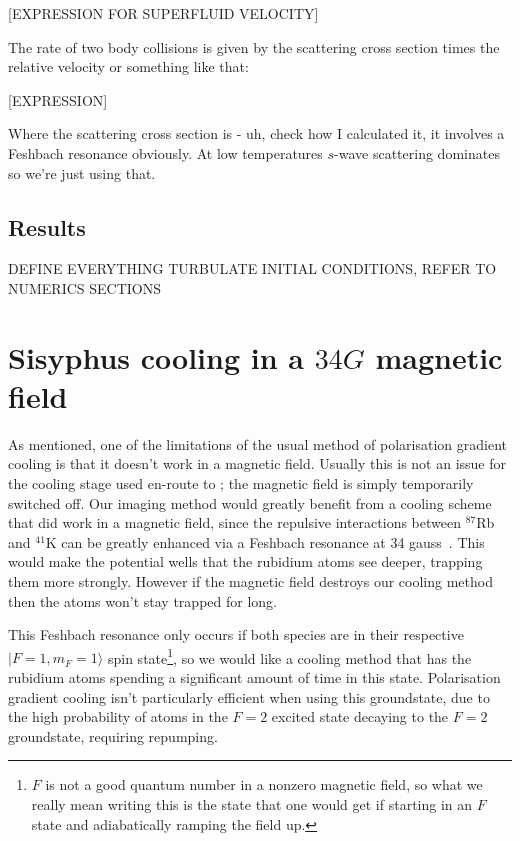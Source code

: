 [EXPRESSION FOR SUPERFLUID VELOCITY]

The rate of two body collisions is given by the scattering cross section times the relative velocity or something like that:

[EXPRESSION]

Where the scattering cross section is - uh, check how I calculated it, it involves a Feshbach resonance obviously. At low temperatures $s$-wave scattering dominates so we're just using that.


\subsection{Results}

DEFINE EVERYTHING TURBULATE INITIAL CONDITIONS, REFER TO NUMERICS SECTIONS

\section{Sisyphus cooling in a $34\unit{G}$ magnetic field}\label{sec:laser_cooling_simulations}

As mentioned, one of the limitations of the usual method of polarisation gradient cooling is that it doesn't work in a magnetic field. Usually this is not an issue for the cooling stage used en-route to \bec; the magnetic field is simply temporarily switched off. Our imaging method would greatly benefit from a cooling scheme that did work in a magnetic field, since the repulsive interactions between $^{87}$Rb and $^{41}$K can be greatly enhanced via a Feshbach resonance at 34 gauss~\cite{thalhammer_double_2008}. This would make the potential wells that the rubidium atoms see deeper, trapping them more strongly. However if the magnetic field destroys our cooling method then the atoms won't stay trapped for long.

This Feshbach resonance only occurs if both species are in their respective \mbox{$|F=1,m_F=1\rangle$} spin state\footnote{$F$ is not a good quantum number in a nonzero magnetic field, so what we really mean writing this is the state that one would get if starting in an $F$ state and adiabatically ramping the field up.}, so we would like a cooling method that has the rubidium atoms spending a significant amount of time in this state. Polarisation gradient cooling isn't particularly efficient when using this groundstate, due to the high probability of atoms in the $F=2$ excited state decaying to the $F=2$ groundstate, requiring repumping.


